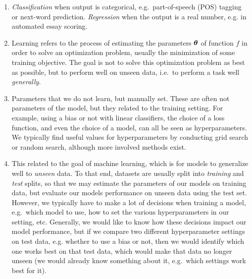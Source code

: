 \documentclass[11pt,a4paper]{article}
\begin{document}
\begin{enumerate}[label=(\alph*)]
\begin{enumerate}[label=(\roman*)]
          \end{enumerate}
    \item \emph{Classification} when output is categorical, e.g.\ part-of-speech
          (POS) tagging or next-word prediction. \emph{Regression} when the
          output is a real number, e.g. in automated essay scoring.
    \item Learning refers to the process of estimating the parameters ${\boldsymbol{\theta}}$
          of function $f$ in order to solve an optimization problem, usually the
          minimization of some training objective.
          The goal is not to solve this optimization problem as best as
          possible, but to perform well on unseen data, i.e.\ to perform a
          task well \emph{generally}.
    \item Parameters that we do not learn, but manually set. These are often not
          parameters of the model, but they related to the training setting.
          For example, using a bias or not with linear classifiers, the choice
          of a loss function, and even the choice of a model, can all be seen as
          hyperparameters.
          We typically find useful values for hyperparameters by conducting
          grid search or random search, although more involved methods exist.
    \item This related to the goal of machine learning, which is for models to
          generalize well to \emph{unseen} data.
          To that end, datasets are usually split into \emph{training} and
          \emph{test} splits, so that we may estimate the parameters of our
          models on training data, but evaluate our models performance on unseen
          data using the test set.
          However, we typically have to make a lot of decisions when training a
          model, e.g.\ which model to use, how to set the various
          hyperparameters in our setting, etc.
          Generally, we would like to know how these decisions impact our model
          performance, but if we compare two different hyperparameter settings
          on test data, e.g. whether to use a bias or not, then we would
          identify which one works best on that test data, which would make that
          data no longer unseen (we would already know something about it, e.g.\
          which settings work best for it).


\end{enumerate}
\end{document}
